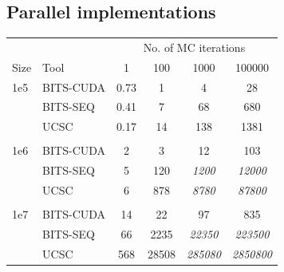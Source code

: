 \documentclass{bioinfo}
\begin{document}


        \subsection{Parallel implementations}

        \centering
        \begin{center}
            \begin{tabular}{l l c c c c}
            \multicolumn{2}{c}{} & \multicolumn{4}{c}{No. of MC iterations} \\
            \cline{3-6}
            Size & Tool & 1 & 100 & 1000 & 100000 \\
            \hline
            \hline
            1e5 & BITS-CUDA & 0.73 & 1  & 4   & 28 \\
                & BITS-SEQ  & 0.41 & 7  & 68  & 680 \\
                & UCSC      & 0.17 & 14 & 138 & 1381 \\
            \\
            1e6 & BITS-CUDA & 2 & 3    & 12       & 103 \\
                & BITS-SEQ  & 5 & 120  & \emph{1200} & \emph{12000} \\
                & UCSC      & 6 & 878  & \emph{8780} & \emph{87800} \\
            \\
            1e7 & BITS-CUDA & 14  & 22    & 97            & 835 \\
                & BITS-SEQ  & 66  & 2235  & \emph{22350}  & \emph{223500} \\
                & UCSC      & 568 & 28508 & \emph{285080} & \emph{2850800} \\
            
            \hline
            \end{tabular}
        \end{center}
        \label{table:avge}
        
\end{document}
